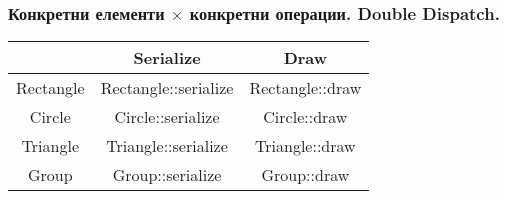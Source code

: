 \documentclass{beamer}
\begin{document}
\begin{frame}[fragile]
  \frametitle{Конкретни елементи $\times$ конкретни операции. Double Dispatch.}

\begin{tabular}{c | c | c}
             & Serialize & Draw \\\hline
  Rectangle  & Rectangle::serialize & Rectangle::draw \\\hline
  Circle  & Circle::serialize & Circle::draw \\\hline
  Triangle  & Triangle::serialize & Triangle::draw \\\hline
  Group  & Group::serialize & Group::draw 
\end{tabular}

\end{frame}
  
\end{document}
